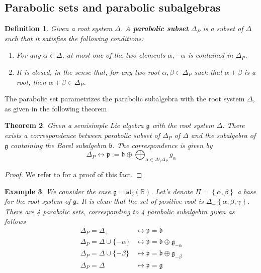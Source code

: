 \documentclass[12pt]{article} %
\newtheorem{definition}{Definition}[section]
\newtheorem{theorem}[definition]{Theorem}
\newtheorem{example}[definition]{Example}
\begin{document}
\subsection{Parabolic sets and parabolic subalgebras}
\begin{definition}
    Given a root system $\Delta$. A \textbf{parabolic subset} $\Delta_P$ is a subset of $\Delta$ such that 
    it satisfies the following conditions:
    \begin{enumerate}
        \item For any $\alpha \in \Delta$, at most one of the two elements $\alpha, - \alpha$ is contained in $\Delta_P$.
        \item It is closed, in the sense that, for any two root $\alpha,\beta \in \Delta_P$ such that $\alpha+\beta$ is a root, then $\alpha+\beta \in \Delta_P$.
    \end{enumerate}
\end{definition}
The parabolic set parametrizes the parabolic subalgebra with the root system $\Delta$, as given in the following theorem
\begin{theorem}
    Given a semisimple Lie algebra $\mathfrak{g}$ with the root system $\Delta$. There exists a correspondence between 
    parabolic subset of $\Delta_P$ of $\Delta$ and the subalgebra of $\mathfrak{g}$ containing the 
    Borel subalgebra $\mathfrak{b}$. The correspondence is given by 
    \[ \Delta_P \longleftrightarrow \mathfrak{p}:= \mathfrak{b}\oplus \bigoplus_{\alpha \in \Delta \setminus \Delta_P} g_{\alpha}\]
\end{theorem}
\begin{proof}
    We refer to \cite{} for a proof of this fact.
\end{proof}
\begin{example}
    We consider the case $\mathfrak{g} = \mathfrak{sl}_3(\mathbb{R})$. Let's denote 
    $\Pi = \left\lbrace \alpha,\beta\right\rbrace$ a base for the root system of $\mathfrak{g}$. It is clear that 
    the set of positive root is $\Delta_+\left\lbrace \alpha,\beta,\gamma \right\rbrace$. There are 
    4 parabolic sets, corresponding to 4 parabolic subalgebra given as follows
    \begin{align*}
        \Delta_P = \Delta_+ &\longleftrightarrow \mathfrak{p} = \mathfrak{b}\\
        \Delta_{P} =\Delta \cup \{-\alpha\} &\longleftrightarrow \mathfrak{p} = \mathfrak{b} \oplus \mathfrak{g}_{-\alpha}\\
        \Delta_{P}= \Delta \cup \{-\beta\} &\longleftrightarrow \mathfrak{p} = \mathfrak{b} \oplus \mathfrak{g}_{-\beta}\\
        \Delta_P= \Delta &\longleftrightarrow \mathfrak{p} = \mathfrak{g}
    \end{align*}
\end{example}
\end{document}
